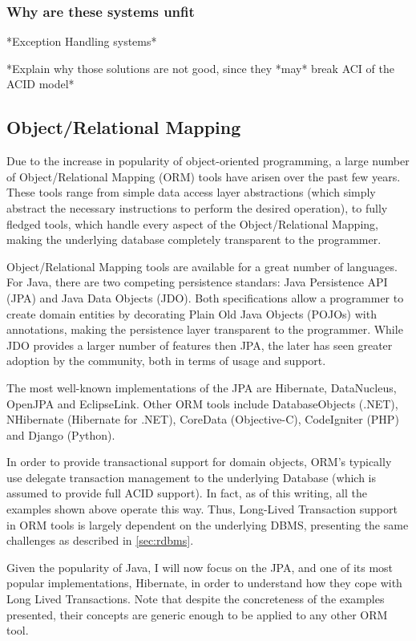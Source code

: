 \documentclass{llncs}
\begin{document}
\subsubsection{Why are these systems unfit}

\cite{798492}

*Exception Handling systems*

*Explain why those solutions are not good, since they *may* break ACI
of the ACID model*

\subsection{Object/Relational Mapping}

Due to the increase in popularity of object-oriented programming, a
large number of Object/Relational Mapping (ORM) tools have arisen over
the past few years\cite{orm}. These tools range from simple data
access layer abstractions (which simply abstract the necessary
instructions to perform the desired operation), to fully fledged
tools, which handle every aspect of the Object/Relational Mapping,
making the underlying database completely transparent to the
programmer.

Object/Relational Mapping tools are available for a great number of
languages. For Java, there are two competing persistence standars:
Java Persistence API (JPA) and Java Data Objects (JDO). Both
specifications allow a programmer to create domain entities by
decorating Plain Old Java Objects (POJOs) with annotations, making the
persistence layer transparent to the programmer. While JDO provides a
larger number of features then JPA, the later has seen greater
adoption by the community, both in terms of usage and support.

The most well-known implementations of the JPA are Hibernate,
DataNucleus, OpenJPA and EclipseLink. Other ORM tools include
DatabaseObjects (.NET), NHibernate (Hibernate for .NET), CoreData
(Objective-C), CodeIgniter (PHP) and Django (Python).

In order to provide transactional support for domain objects, ORM's
typically use delegate transaction management to the underlying
Database (which is assumed to provide full ACID support). In fact, as
of this writing, all the examples shown above operate this way. Thus,
Long-Lived Transaction support in ORM tools is largely dependent on
the underlying DBMS, presenting the same challenges as described in
\ref{sec:rdbms}.

Given the popularity of Java, I will now focus on the JPA, and one of
its most popular implementations, Hibernate, in order to understand
how they cope with Long Lived Transactions. Note that despite the
concreteness of the examples presented, their concepts are generic
enough to be applied to any other ORM tool.
\end{document}
